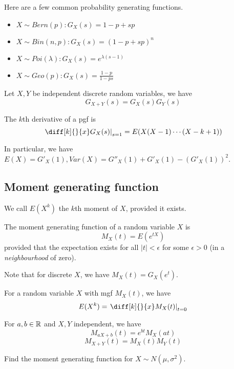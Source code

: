 \documentclass[11pt]{article}
\begin{document}
Here are a few common probability generating functions.
\begin{itemize}
  \item \(X\sim Bern(p): G_X(s)=1-p+sp\)
  \item \(X\sim Bin(n,p): G_X(s)=(1-p+sp)^n\)
  \item \(X\sim Poi(\lambda): G_X(s)=e^{\lambda(s-1)}\)
  \item \(X\sim Geo(p): G_X(s)=\frac{1-p}{1-ps}\)
\end{itemize}

\begin{theorem}
  Let \(X,Y\) be independent discrete random variables, we have 
  \[G_{X+Y}(s)=G_X(s)G_Y(s)\]
\end{theorem}

\begin{theorem}
  The \(k\)th derivative of a pgf is
  \[\left.\diff[k]{}{x}G_X(s)\right\rvert_{s=1}=E(X(X-1)\cdots(X-k+1))\]
\end{theorem}
In particular, we have \(E(X)=G'_X(1), Var(X)=G''_X(1)+G'_X(1)-(G'_X(1))^2\).
\subsection{Moment generating function}
\begin{definition}[Moment]
  We call \(E(X^k)\) the \(k\)th moment of \(X\), provided it exists.
\end{definition}
\begin{definition}
  The moment generating function of a random variable \(X\) is
  \[M_X(t)=E(e^{tX})\]
  provided that the expectation exists for all \(|t|<\epsilon\) for some \(\epsilon>0\) (in a \emph{neighbourhood} of zero).
\end{definition}
Note that for discrete \(X\), we have \(M_X(t)=G_X(e^t)\).

\begin{theorem}
  For a random variable \(X\) with mgf \(M_X(t)\), we have
  \[E(X^k)=\left.\diff[k]{}{x}M_X(t)\right\rvert_{t=0}\]
\end{theorem}

\begin{proposition}
  For \(a,b\in\mathbb{R}\) and \(X,Y\) independent, we have
  \[M_{aX+b}(t)=e^{bt}M_X(at)\]
  \[M_{X+Y}(t)=M_X(t)M_Y(t)\]
\end{proposition}

\begin{problem}
  Find the moment generating function for \(X\sim N(\mu,\sigma^2)\).
\end{problem}
\end{document}
